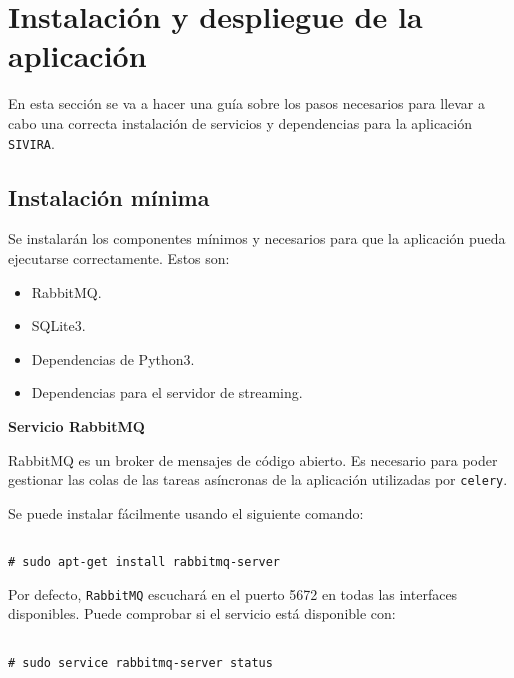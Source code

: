 \section{Instalación y despliegue de la aplicación}

En esta sección se va a hacer una guía sobre los pasos necesarios para llevar a cabo una correcta instalación de servicios y dependencias para la aplicación \texttt{SIVIRA}.

\subsection{Instalación mínima}

Se instalarán los componentes mínimos y necesarios para que la aplicación pueda ejecutarse correctamente. Estos son:

\begin{itemize}
\item RabbitMQ.
\item SQLite3.
\item Dependencias de Python3.
\item Dependencias para el servidor de streaming.
\end{itemize}


\textbf{Servicio RabbitMQ}

RabbitMQ es un broker de mensajes de código abierto. Es necesario para poder gestionar las colas de las tareas asíncronas de la aplicación utilizadas por \texttt{celery}.

Se puede instalar fácilmente usando el siguiente comando:

\vspace{-1.4cm}

\begin{verbatim}

# sudo apt-get install rabbitmq-server

\end{verbatim}

\vspace{-1.4cm}

Por defecto, \texttt{RabbitMQ} escuchará en el puerto 5672 en todas las interfaces disponibles. Puede comprobar si el servicio está disponible con:


\vspace{-1.4cm}

\begin{verbatim}

# sudo service rabbitmq-server status

\end{verbatim}

